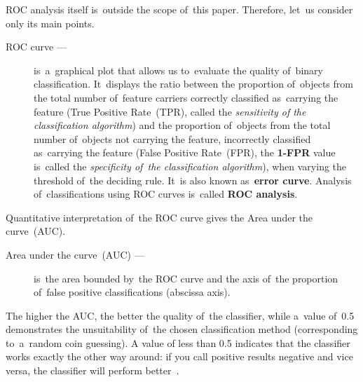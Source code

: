 \documentclass[]{scrreprt}
\begin{document}
ROC analysis itself is~outside the scope of~this paper. Therefore, let~us consider only its main points.
\begin{description}
	\item[ROC curve ---] is~a~graphical plot that allows us to~evaluate the quality of~binary classification. It~displays the ratio between the proportion of~objects from the total number of~feature carriers correctly classified as~carrying the feature (True Positive Rate~(TPR), called the \emph{sensitivity of the classification algorithm}) and the proportion of~objects from the total number of~objects not carrying the feature, incorrectly classified as~carrying the feature (False Positive Rate~(FPR), the \textbf{1-FPR} value is~called the \emph{specificity of~the classification algorithm}), when varying the threshold of~the deciding rule.	It~is also known as~\textbf{error curve}. Analysis of~classifications using ROC curves is~called \textbf{ROC analysis}.
\end{description}
Quantitative interpretation of~the ROC curve gives the Area under the curve~(AUC).
\begin{description}
	\item[Area under the curve~(AUC) ---] is~the area bounded by~the ROC curve and the axis of~the proportion of~false positive classifications (abscissa axis).
\end{description}
The higher the AUC, the better the quality of~the classifier, while a~value of~0.5 demonstrates the unsuitability of~the chosen classification method (corresponding to~a~random coin guessing). A value of less than 0.5 indicates that the classifier works exactly the other way around: if you call positive results negative and vice versa, the classifier will perform better~\cite{Wiki:ROC}.
\end{document}

